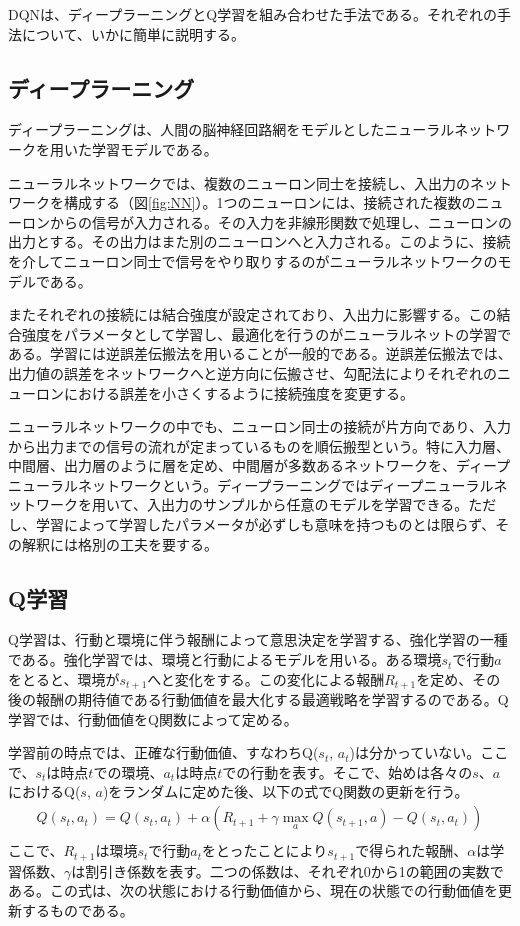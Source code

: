 \documentclass[12pt]{jarticle}
\begin{document}
DQNは、ディープラーニングとQ学習を組み合わせた手法である。それぞれの手法について、いかに簡単に説明する。

\subsection{ディープラーニング}
ディープラーニングは、人間の脳神経回路網をモデルとしたニューラルネットワークを用いた学習モデルである。

ニューラルネットワークでは、複数のニューロン同士を接続し、入出力のネットワークを構成する（図\ref{fig:NN}）。1つのニューロンには、接続された複数のニューロンからの信号が入力される。その入力を非線形関数で処理し、ニューロンの出力とする。その出力はまた別のニューロンへと入力される。このように、接続を介してニューロン同士で信号をやり取りするのがニューラルネットワークのモデルである。

またそれぞれの接続には結合強度が設定されており、入出力に影響する。この結合強度をパラメータとして学習し、最適化を行うのがニューラルネットの学習である。学習には逆誤差伝搬法を用いることが一般的である。逆誤差伝搬法では、出力値の誤差をネットワークへと逆方向に伝搬させ、勾配法によりそれぞれのニューロンにおける誤差を小さくするように接続強度を変更する。

ニューラルネットワークの中でも、ニューロン同士の接続が片方向であり、入力から出力までの信号の流れが定まっているものを順伝搬型という。特に入力層、中間層、出力層のように層を定め、中間層が多数あるネットワークを、ディープニューラルネットワークという。ディープラーニングではディープニューラルネットワークを用いて、入出力のサンプルから任意のモデルを学習できる。ただし、学習によって学習したパラメータが必ずしも意味を持つものとは限らず、その解釈には格別の工夫を要する。

\subsection{Q学習}
Q学習は、行動と環境に伴う報酬によって意思決定を学習する、強化学習の一種である。強化学習では、環境と行動によるモデルを用いる。ある環境$s_{t}$で行動$a$をとると、環境が$s_{t+1}$へと変化をする。この変化による報酬$R_{t+1}$を定め、その後の報酬の期待値である行動価値を最大化する最適戦略を学習するのである。Q学習では、行動価値をQ関数によって定める。

学習前の時点では、正確な行動価値、すなわちQ($s_t$, $a_t$)は分かっていない。ここで、$s_t$は時点$t$での環境、$a_t$は時点$t$での行動を表す。そこで、始めは各々の$s$、$a$におけるQ($s$, $a$)をランダムに定めた後、以下の式でQ関数の更新を行う。
\begin{eqnarray}
  Q(s_{t}, a_{t}) = Q(s_t, a_t) + \alpha (R_{t+1} + \gamma \max_a Q(s_{t+1}, a) - Q(s_t, a_t)) \nonumber\\
\end{eqnarray}
ここで、$R_{t+1}$は環境$s_t$で行動$a_t$をとったことにより$s_{t+1}$で得られた報酬、$\alpha$は学習係数、$\gamma$は割引き係数を表す。二つの係数は、それぞれ0から1の範囲の実数である。この式は、次の状態における行動価値から、現在の状態での行動価値を更新するものである。
\end{document}
